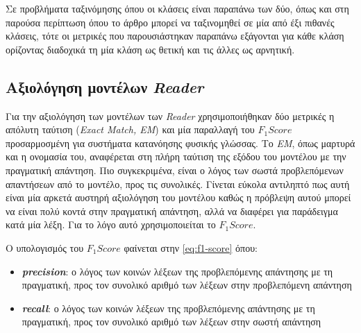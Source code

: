 Σε προβλήματα ταξινόμησης όπου οι κλάσεις είναι παραπάνω των δύο, όπως και στη παρούσα περίπτωση όπου το άρθρο μπορεί να ταξινομηθεί σε μία από έξι πιθανές κλάσεις, τότε οι μετρικές που παρουσιάστηκαν παραπάνω εξάγονται για κάθε κλάση ορίζοντας διαδοχικά τη μία κλάση ως θετική και τις άλλες ως αρνητική.

\subsection{Αξιολόγηση μοντέλων \emph{Reader}}

Για την αξιολόγηση των μοντέλων των \emph{Reader} χρησιμοποιήθηκαν δύο μετρικές η απόλυτη ταύτιση (\emph{Exact Match, EM}) και μία παραλλαγή του \emph{$F_1 Score$} προσαρμοσμένη για συστήματα κατανόησης φυσικής γλώσσας. Το \emph{EM}, όπως μαρτυρά και η ονομασία του, αναφέρεται στη πλήρη ταύτιση της εξόδου του μοντέλου με την πραγματική απάντηση. Πιο συγκεκριμένα, είναι ο λόγος των σωστά προβλεπόμενων απαντήσεων από το μοντέλο, προς τις συνολικές. Γίνεται εύκολα αντιληπτό πως αυτή είναι μία αρκετά αυστηρή αξιολόγηση του μοντέλου καθώς η πρόβλεψη αυτού μπορεί να είναι πολύ κοντά στην πραγματική απάντηση, αλλά να διαφέρει για παράδειγμα κατά μία λέξη. Για το λόγο αυτό χρησιμοποιείται το \emph{$F_1 Score$}.

Ο υπολογισμός του \emph{$F_1 Score$} φαίνεται στην \autoref{eq:f1-score} όπου:
\begin{itemize}
    \item \textbf{\emph{precision}}: ο λόγος των κοινών λέξεων της προβλεπόμενης απάντησης με τη πραγματική, προς τον συνολικό αριθμό των λέξεων στην προβλεπόμενη απάντηση
    \item \textbf{\emph{recall}}: ο λόγος των κοινών λέξεων της προβλεπόμενης απάντησης με τη πραγματική, προς τον συνολικό αριθμό των λέξεων στην σωστή απάντηση
\end{itemize}